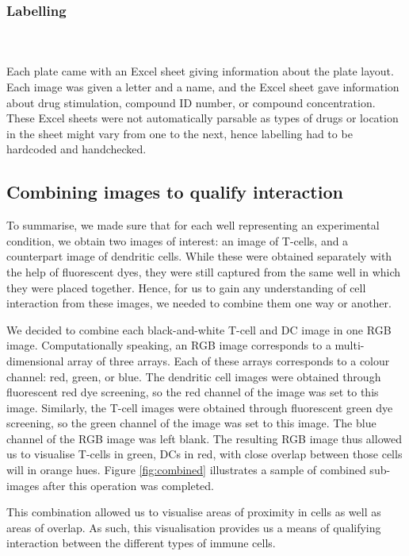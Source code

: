 \bigskip
\subsubsection{Labelling}

\hfill\\
\hfill\\
Each plate came with an Excel sheet giving information about the plate layout. Each image was given a letter and a name, and the Excel sheet gave information about drug stimulation, compound ID number, or compound concentration. These Excel sheets were not automatically parsable as types of drugs or location in the sheet might vary from one to the next, hence labelling had to be hardcoded and handchecked.

\subsection{Combining images to qualify interaction} \label{subsec:combining}

To summarise, we made sure that for each well representing an experimental condition, we obtain two images of interest: an image of T-cells, and a counterpart image of dendritic cells. While these were obtained separately with the help of fluorescent dyes, they were still captured from the same well in which they were placed together. Hence, for us to gain any understanding of cell interaction from these images, we needed to combine them one way or another.

We decided to combine each black-and-white T-cell and DC image in one RGB image. Computationally speaking, an RGB image corresponds to a multi-dimensional array of three arrays. Each of these arrays corresponds to a colour channel: red, green, or blue. The dendritic cell images were obtained through fluorescent red dye screening, so the red channel of the image was set to this image. Similarly, the T-cell images were obtained through fluorescent green dye screening, so the green channel of the image was set to this image. The blue channel of the RGB image was left blank. The resulting RGB image thus allowed us to visualise T-cells in green, DCs in red, with close overlap between those cells will in orange hues. Figure \ref{fig:combined} illustrates a sample of combined sub-images after this operation was completed.

This combination allowed us to visualise areas of proximity in cells as well as areas of overlap. As such, this visualisation provides us a means of qualifying interaction between the different types of immune cells.

